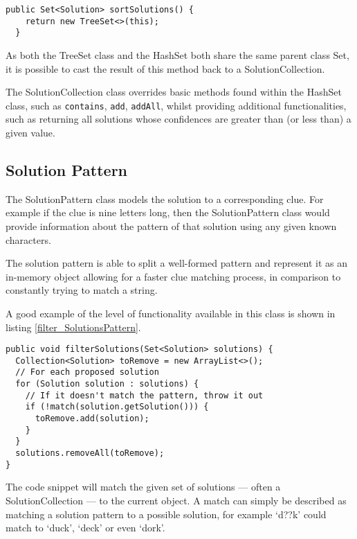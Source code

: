 \begin{lstlisting}[caption={Method returns a new sorted collection},
                   label=sortSolutions_SolutionsCollection] 
  public Set<Solution> sortSolutions() {
    return new TreeSet<>(this);
  }
\end{lstlisting}

As both the TreeSet class and the HashSet both share the same parent class Set,
it is possible to cast the result of this method back to a SolutionCollection.

The SolutionCollection class overrides basic methods found within the HashSet 
class, such as \texttt{contains}, \texttt{add}, \texttt{addAll}, whilst 
providing additional functionalities, such as returning all solutions whose 
confidences are greater than (or less than) a given value.


\subsection{Solution Pattern}
\label{sub:solution_pattern}

The SolutionPattern class models the solution to a corresponding clue. For 
example if the clue is nine letters long, then the SolutionPattern class would 
provide information about the pattern of that solution using any given known 
characters.

The solution pattern is able to split a well-formed pattern and represent it 
as an in-memory object allowing for a faster clue matching process, in 
comparison to constantly trying to match a string.

A good example of the level of functionality available in this class is shown 
in listing \ref{filter_SolutionsPattern}.

\begin{lstlisting}[caption={Method returns collection of matched solutions},
                   label=filter_SolutionsPattern] 
public void filterSolutions(Set<Solution> solutions) {
  Collection<Solution> toRemove = new ArrayList<>();
  // For each proposed solution
  for (Solution solution : solutions) {
    // If it doesn't match the pattern, throw it out
    if (!match(solution.getSolution())) {
      toRemove.add(solution);
    }
  }
  solutions.removeAll(toRemove);
}
\end{lstlisting}  

The code snippet will match the given set of solutions --- often a 
SolutionCollection --- to the current object. A match can simply be described as
matching a solution pattern to a possible solution, for example `d??k' could 
match to `duck', `deck' or even `dork'.

